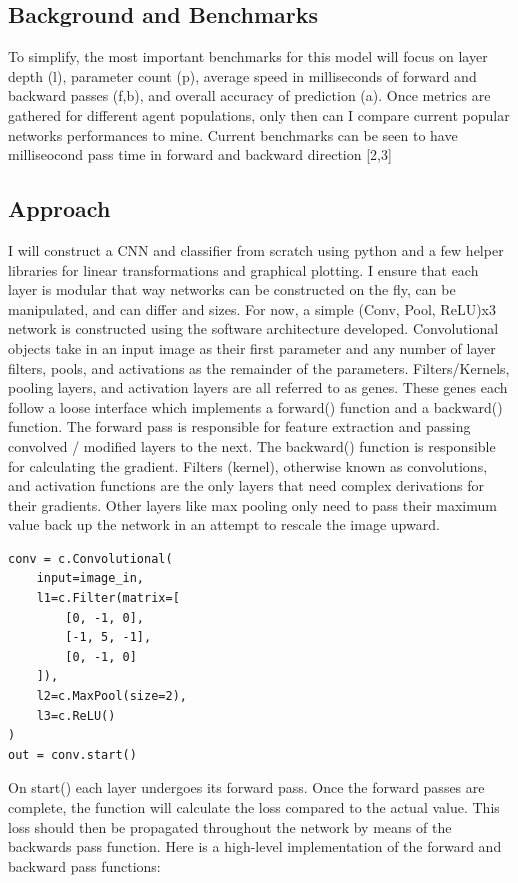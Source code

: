 \documentclass[journal]{IEEEtai}
\begin{document}
\subsection{Background and Benchmarks}

To simplify, the most important benchmarks for this model will focus on layer depth (l), parameter count (p), average speed in milliseconds of forward and backward passes (f,b), and overall accuracy of prediction (a). Once metrics are gathered for different agent populations, only then can I compare current popular networks performances to mine. Current benchmarks can be seen to have milliseocond pass time in forward and backward direction [2,3]


\subsection{Approach}
I will construct a CNN and classifier from scratch using python and a few helper libraries for linear transformations and graphical plotting. I ensure that each layer is modular that way networks can be constructed on the fly, can be manipulated, and can differ and sizes. For now, a simple (Conv, Pool, ReLU)x3  network is constructed using the software architecture developed. Convolutional objects take in an input image as their first parameter and any number of layer filters, pools, and activations as the remainder of the parameters. Filters/Kernels, pooling layers, and activation layers are all referred to as genes. These genes each follow a loose interface which implements a forward() function and a backward() function. The forward pass is responsible for feature extraction and passing convolved / modified layers to the next. The backward() function is responsible for calculating the gradient. Filters (kernel), otherwise known as convolutions, and activation functions are the only layers that need complex derivations for their gradients. Other layers like max pooling only need to pass their maximum value back up the network in an attempt to rescale the image upward. 

\clearpage
\begin{lstlisting}
conv = c.Convolutional(
    input=image_in,
    l1=c.Filter(matrix=[
        [0, -1, 0],
        [-1, 5, -1],
        [0, -1, 0]
    ]),
    l2=c.MaxPool(size=2),
    l3=c.ReLU()
)
out = conv.start()

\end{lstlisting}

On start() each layer undergoes its forward pass. Once the forward passes are complete, the function will calculate the loss compared to the actual value. This loss should then be propagated throughout the network by means of the backwards pass function. Here is a high-level implementation of the forward and backward pass functions:
\end{document}
